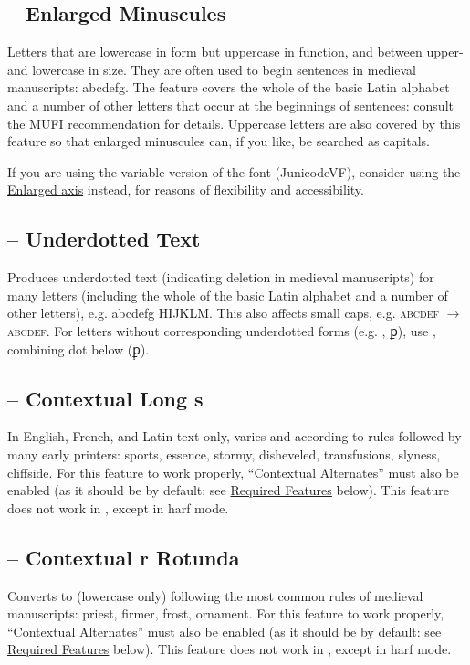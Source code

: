 \subsection{ --
Enlarged Minuscules}\hypertarget{ss06}{}
Letters that are lowercase in form but uppercase in function, and between upper- and
lowercase in size. They are often used to begin sentences in medieval manuscripts:
{abcdefg}. The feature
covers the whole of the basic Latin alphabet and a number of other letters that
occur at the beginnings of sentences: consult the MUFI recommendation for details.
Uppercase letters are also covered by this feature so that enlarged minuscules
can, if you like, be searched as capitals.

If you are using the variable version of the font (JunicodeVF), consider using the
\href{https://psb1558.github.io/Junicode-New/EnlargedAxis.html}{Enlarged axis} instead, for reasons of flexibility and
accessibility.

\subsection{ --
Underdotted Text}
Produces underdotted text (indicating deletion in medieval manuscripts) for many
letters (including
the whole of the basic Latin alphabet and a number of other letters), e.g.
{abcdefg HIJKLM}. This also affects small
caps, e.g. \textsc{abcdef} $\rightarrow $ {\textsc{abcdef}}.
For letters without corresponding underdotted forms (e.g. , ꝑ),
use , combining dot below (\hspace{0.05em}ꝑ̣).

\subsection{ --
Contextual Long s}
In English, French, and Latin text only, varies  and  according to rules
followed by many early printers: {\colongs sports, essence, stormy, disheveled, transfusions, slyness, cliffside}. For this
feature to work properly,  ``Contextual Alternates'' must also be enabled (as it should be by
default: see \hyperlink{req}{Required Features} below). This feature does not work in {\ltech}, except in harf mode.

\subsection{ --
Contextual r Rotunda}\hypertarget{ss16}{}
Converts  to  (lowercase only) following the
most common rules of medieval manuscripts: {priest, firmer, frost, ornament}. For this feature to work properly,
 ``Contextual Alternates'' must also be enabled (as it should be by default: see
\hyperlink{req}{Required Features} below).  This feature does not work in {\ltech}, except in harf mode.


